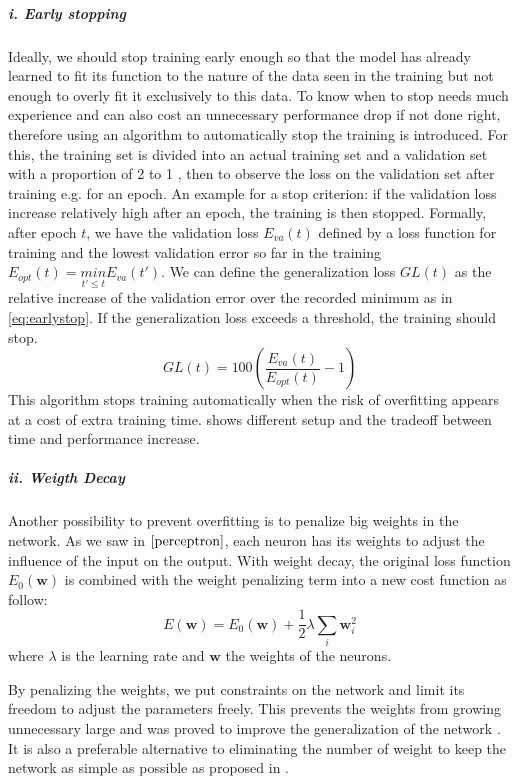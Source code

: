 \subparagraph*{i. Early stopping} Ideally, we should stop training early enough so that the model has already learned to fit its function to the nature of the data seen in the training but not enough to overly fit it exclusively to this data. To know when to stop needs much experience and can also cost an unnecessary performance drop if not done right, therefore using an algorithm to automatically stop the training is introduced. For this, the training set is divided into an actual training set and a validation set with a proportion of 2 to 1 \cite{overfitearlystop}, then to observe the loss on the validation set after training e.g. for an epoch. An example for a stop criterion: if the validation loss increase relatively high after an epoch, the training is then stopped. Formally, after epoch $t$, we have the validation loss $E_{va}(t)$ defined by a loss function for training and the lowest validation error so far in the training $E_{opt}(t) = \underset{t'\leq t}{min}E_{va}(t')$. We can define the generalization loss $GL(t)$ as the relative increase of the validation error over the recorded minimum as in \eqref{eq:earlystop}. If the generalization loss exceeds a threshold, the training should stop. 
	\begin{equation} \label{eq:earlystop}
			GL(t) = 100 \left( \frac{E_{va}(t)}{E_{opt}(t)} - 1 \right)
	\end{equation}
This algorithm stops training automatically when the risk of overfitting appears at a cost of extra training time. \cite{overfitearlystop} shows different setup and the tradeoff between time and performance increase. 
\subparagraph*{ii. Weigth Decay} Another possibility to prevent overfitting is to penalize big weights in the network. As we saw in $\ref{perceptron}$, each neuron has its weights to adjust the influence of the input on the output. With weight decay, the original loss function $E_0(\bm{w})$ is combined with the weight penalizing term into a new cost function as follow: 	
	\begin{equation} \label{eq:weightdecay}
			E(\bm{w}) = E_0(\bm{w}) + \frac{1}{2}\lambda\underset{i}{\sum}\bm{w}_i^2
	\end{equation}
where $\lambda$ is the learning rate and $\bm{w}$ the weights of the neurons. 

By penalizing the weights, we put constraints on the network and limit its freedom to adjust the parameters freely. This prevents the weights from growing unnecessary large and was proved to improve the generalization of the network \cite{overfitweightdecay}. It is also a preferable alternative to eliminating the number of weight to keep the network as simple as possible as proposed in \cite{overfitweightelim}.

